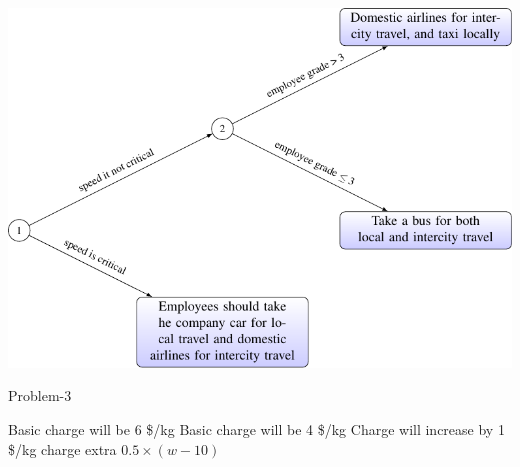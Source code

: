\documentclass[12pt]{article}
\begin{document}
\includegraphics[width = 0.9\linewidth]{img/fig-2.pdf}
\begin{algorithm}
    \caption{Problem-3}\label{alg:problem-3}
    \begin{algorithmic}[1]
        \State Basic charge will be 6 \$/kg
        \Else
        \State Basic charge will be 4 \$/kg
        \EndIf
        \State Charge will increase by 1 \$/kg
        \EndIf
        \State charge extra \(0.5 \times (w - 10)\)
        \EndIf
    \end{algorithmic}
\end{algorithm}
\end{document}
